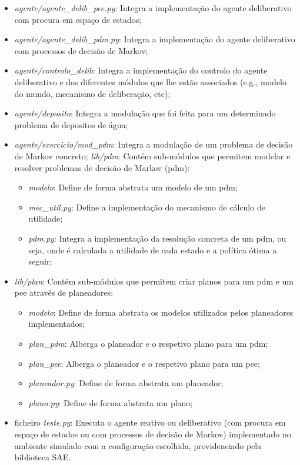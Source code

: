 \begin{itemize}
    \item \textit{agente/agente\_delib\_pee.py}: Integra a implementação do agente deliberativo com procura em espaço de estados;
    \item \textit{agente/agente\_delib\_pdm.py}: Integra a implementação do agente deliberativo com processos de decisão de Markov;
    \item \textit{agente/controlo\_delib}: Integra a implementação do controlo do agente deliberativo e dos diferentes módulos que lhe estão associados (e.g., modelo do mundo, mecanismo de deliberação, etc);
    \item \textit{agente/deposito}: Integra a modulação que foi feita para um determinado problema de depositos de água;
    \item \textit{agente/exercicio/mod\_pdm}: Integra a modulação de um problema de decisão de Markov concreto;
    \textit{lib/pdm}: Contém sub-módulos que permitem modelar e resolver problemas de decisão de Markov (pdm):
    \begin{itemize}
        \item \textit{modelo}: Define de forma abstrata um modelo de um pdm;
        \item \textit{mec\_util.py}: Define a implementação do mecanismo de cálculo de utilidade;
        \item \textit{pdm.py}: Integra a implementação da resolução concreta de um pdm, ou seja, onde é calculada a utilidade de cada estado e a política ótima a seguir;
    \end{itemize}
    \item \textit{lib/plan}: Contém sub-módulos que permitem criar planos para um pdm e um pee através de planeadores:
    \begin{itemize}
        \item \textit{modelo}: Define de forma abstrata os modelos utilizados pelos planeadores implementados;
        \item \textit{plan\_pdm}: Alberga o planeador e o respetivo plano para um pdm;
        \item \textit{plan\_pee}: Alberga o planeador e o respetivo plano para um pee;
        \item \textit{planeador.py}: Define de forma abstrata um planeador;
        \item \textit{plano.py}: Define de forma abstrata um plano;
    \end{itemize}
    \item ficheiro \textit{teste.py}: Executa o agente reativo ou deliberativo (com procura em espaço de estados ou com processos de decisão de Markov) implementado no ambiente simulado com a configuração escolhida, providenciado pela biblioteca SAE.
\end{itemize}
